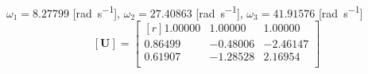 %
%


%
\(\omega_{1} =  8.27799\) [\si{\radian\per\second}],
\(\omega_{2} = 27.40863\) [\si{\radian\per\second}],
\(\omega_{3} = 41.91576\) [\si{\radian\per\second}]
\begin{equation}\label{eq:raymodeprop}
  [\mathbf{U}] = \begin{bmatrix*}[r]
    1.00000 & 1.00000 & 1.00000 \\
	  0.86499 &-0.48006 &-2.46147 \\
	  0.61907 &-1.28528 & 2.16954 \\
	\end{bmatrix*}
\end{equation}
